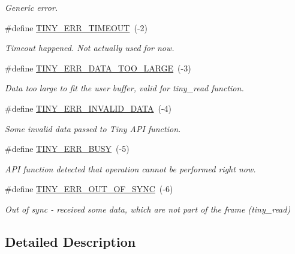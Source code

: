\begin{DoxyCompactItemize}
\begin{DoxyCompactList}\small\item\em Generic error. \end{DoxyCompactList}\item 
\hypertarget{group__ERROR__FLAGS_gac9ba8076a1eb8613e8d1f07629ff0cd1}{}\#define \hyperlink{group__ERROR__FLAGS_gac9ba8076a1eb8613e8d1f07629ff0cd1}{T\+I\+N\+Y\+\_\+\+E\+R\+R\+\_\+\+T\+I\+M\+E\+O\+U\+T}~(-\/2)\label{group__ERROR__FLAGS_gac9ba8076a1eb8613e8d1f07629ff0cd1}

\begin{DoxyCompactList}\small\item\em Timeout happened. Not actually used for now. \end{DoxyCompactList}\item 
\hypertarget{group__ERROR__FLAGS_ga7bbe7440d11ad304b0af68e011f4eab7}{}\#define \hyperlink{group__ERROR__FLAGS_ga7bbe7440d11ad304b0af68e011f4eab7}{T\+I\+N\+Y\+\_\+\+E\+R\+R\+\_\+\+D\+A\+T\+A\+\_\+\+T\+O\+O\+\_\+\+L\+A\+R\+G\+E}~(-\/3)\label{group__ERROR__FLAGS_ga7bbe7440d11ad304b0af68e011f4eab7}

\begin{DoxyCompactList}\small\item\em Data too large to fit the user buffer, valid for tiny\+\_\+read function. \end{DoxyCompactList}\item 
\hypertarget{group__ERROR__FLAGS_ga541a9e67a84e39595ad647d641c4df2e}{}\#define \hyperlink{group__ERROR__FLAGS_ga541a9e67a84e39595ad647d641c4df2e}{T\+I\+N\+Y\+\_\+\+E\+R\+R\+\_\+\+I\+N\+V\+A\+L\+I\+D\+\_\+\+D\+A\+T\+A}~(-\/4)\label{group__ERROR__FLAGS_ga541a9e67a84e39595ad647d641c4df2e}

\begin{DoxyCompactList}\small\item\em Some invalid data passed to Tiny A\+P\+I function. \end{DoxyCompactList}\item 
\hypertarget{group__ERROR__FLAGS_ga9b3e170e1c6ce269f216ef4a1ac61995}{}\#define \hyperlink{group__ERROR__FLAGS_ga9b3e170e1c6ce269f216ef4a1ac61995}{T\+I\+N\+Y\+\_\+\+E\+R\+R\+\_\+\+B\+U\+S\+Y}~(-\/5)\label{group__ERROR__FLAGS_ga9b3e170e1c6ce269f216ef4a1ac61995}

\begin{DoxyCompactList}\small\item\em A\+P\+I function detected that operation cannot be performed right now. \end{DoxyCompactList}\item 
\hypertarget{group__ERROR__FLAGS_gae1949de45d9c478830dad9c9b996193a}{}\#define \hyperlink{group__ERROR__FLAGS_gae1949de45d9c478830dad9c9b996193a}{T\+I\+N\+Y\+\_\+\+E\+R\+R\+\_\+\+O\+U\+T\+\_\+\+O\+F\+\_\+\+S\+Y\+N\+C}~(-\/6)\label{group__ERROR__FLAGS_gae1949de45d9c478830dad9c9b996193a}

\begin{DoxyCompactList}\small\item\em Out of sync -\/ received some data, which are not part of the frame (tiny\+\_\+read) \end{DoxyCompactList}\end{DoxyCompactItemize}


\subsection{Detailed Description}
